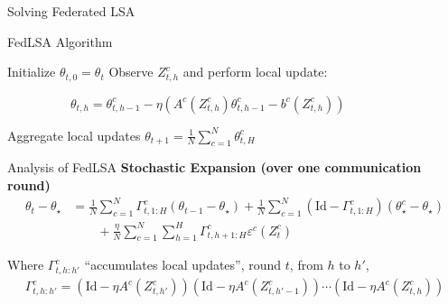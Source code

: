 \documentclass[aspectratio=169,14pt]{beamer}
\begin{document}
\begin{frame}
  \vspace{6em}

  \begin{center}
    \textcolor{beamer@blendedblue}{
      \huge Solving Federated LSA
    }
  \end{center}

  \vspace{3em}
  

  \small
\end{frame}



\begin{frame}{FedLSA Algorithm}
  \begin{algorithmic}
    \State Initialize $\theta_{t,0} = \theta_t$
    \State Observe $Z^c_{t,h}$ and perform local update:
    \begin{center}
      ~~~~~~~~~~$\theta_{t,h} = \theta_{t,h-1}^c - \eta( A^c(Z^c_{t,h}) \theta_{t,h-1}^c - b^c(Z^c_{t,h}))$
    \end{center}
    \EndFor
    \EndFor
    \State Aggregate local updates $\theta_{t+1} = \tfrac{1}{N} \sum\nolimits_{c=1}^{N} \theta_{t,H}^c $
    \EndFor
  \end{algorithmic}  
\end{frame}


\begin{frame}{Analysis of FedLSA}
  \textbf{Stochastic Expansion (over one communication round)}
  \begin{align*}
    \theta_{t} - \theta_\star
    & =
    \frac{1}{N} \sum_{c=1}^N \Gamma_{t,1:H}^c (\theta_{t-1} - \theta_\star)
    + \frac{1}{N} \sum_{c=1}^N (\text{Id} - \Gamma_{t,1:H}^c) (\theta_\star^c - \theta_\star)
    \\
    & \qquad + \frac{\eta}{N} \sum_{c=1}^N \sum_{h=1}^H \Gamma_{t,h+1:H}^c \varepsilon^c(Z_t^c)
  \end{align*}

  Where $\Gamma_{t,h:h'}^c$ ``accumulates local updates'', round $t$, from $h$ to $h'$,
  \begin{align*}
    \Gamma_{t,h:h'}^c = (\text{Id} - \eta A^c(Z^c_{t,h'})) (\text{Id} - \eta A^c(Z^c_{t,h'-1})) \cdots (\text{Id} - \eta A^c(Z^c_{t,h}))
  \end{align*}  
\end{frame}
\end{document}
